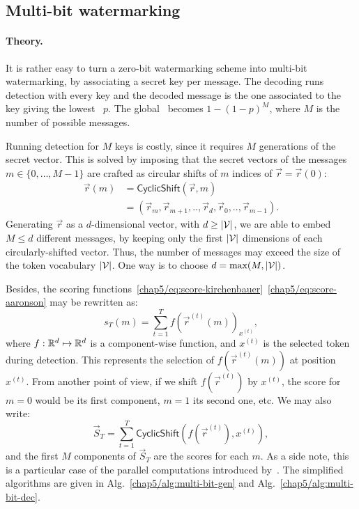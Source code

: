 \subsection{Multi-bit watermarking}

       
    


\paragraph*{Theory.} It is rather easy to turn a zero-bit watermarking scheme into multi-bit watermarking, by associating a secret key per message. 
The decoding runs detection with every key and the decoded message is the one associated to the key giving the lowest \pval\ $p$. 
The global \pval\ becomes $1-(1-p)^M$, where $M$ is the number of possible messages.

Running detection for $M$ keys is costly, since it requires $M$ generations of the secret vector.
This is solved by imposing that the secret vectors of the messages $m\in\{0,\ldots,M-1\}$ are crafted as circular shifts of $m$ indices of $\vec{r}=\vec{r}(0)$:
\begin{align*}
\vec{r}(m) &= \mathsf{CyclicShift}(\vec{r},m) \\
    &= \left( \vec{r}_m, \vec{r}_{m+1}, ..,\vec{r}_{d}, \vec{r}_{0}, ..,  \vec{r}_{m-1}  \right).
\end{align*}
Generating $\vec{r}$ as a $d$-dimensional vector, with $d\geq|\mathcal{V}|$, we are able to embed $M\leq d$ different messages, by keeping only the first $|\mathcal{V}|$ dimensions of each circularly-shifted vector. 
Thus, the number of messages may exceed the size of the token vocabulary $|\mathcal{V}|$.
One way is to choose $d =  \textrm{max}(M, |\mathcal{V}|)$.



Besides, the scoring functions~\eqref{chap5/eq:score-kirchenbauer}~\eqref{chap5/eq:score-aaronson}
may be rewritten as:
\begin{equation}
s_T(m) = \sum_{t=1}^T f\left(\vec{r}^{(t)}(m)\right)_{x^{(t)}}  ,
\end{equation}
where $f: \mathbb{R}^d \mapsto \mathbb{R}^d$ is a component-wise function, and $x^{(t)}$ is the selected token during detection. 
This represents the selection of $f\left(\vec{r}^{(t)}(m)\right)$ at position $x^{(t)}$.
From another point of view, if we shift $f\left(\vec{r}^{(t)}\right)$ by $x^{(t)}$, the score for $m=0$ would be its first component, $m=1$ its second one, etc.
We may also write:
\begin{equation}
\vec{S}_T = \sum_{t=1}^T \mathsf{CyclicShift}\left( f\left(\vec{r}^{(t)}\right), x^{(t)} \right) ,
\label{chap5/eq:DetectionMultibit}
\end{equation}
and the first $M$ components of $\vec{S}_T$ are the scores for each $m$.
As a side note, this is a particular case of the parallel computations introduced by~\citet{JAWS}.
The simplified algorithms are given in Alg.~\ref{chap5/alg:multi-bit-gen} and Alg.~\ref{chap5/alg:multi-bit-dec}. 

